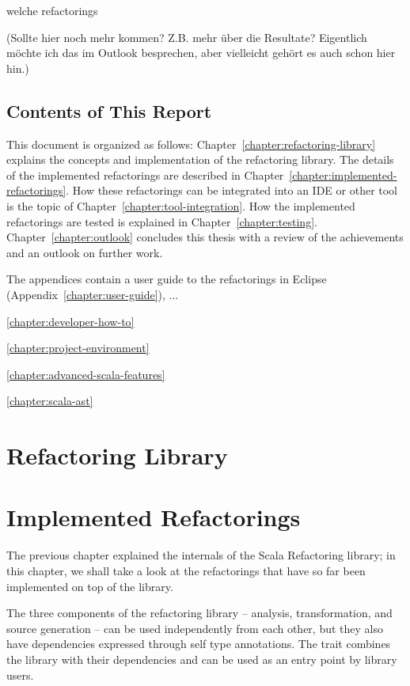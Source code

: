 \documentclass[10pt,a4paper,oneside]{scrreprt}
\begin{document}
welche refactorings

(Sollte hier noch mehr kommen? Z.B. mehr \"uber die Resultate? Eigentlich m\"ochte ich das im Outlook besprechen, aber vielleicht geh\"ort es auch schon hier hin.)

\section{Contents of This Report}

This document is organized as follows: Chapter~\vref{chapter:refactoring-library} explains the concepts and implementation of the refactoring library. The details of the implemented refactorings are described in Chapter~\vref{chapter:implemented-refactorings}. How these refactorings can be integrated into an IDE or other tool is the topic of Chapter~\vref{chapter:tool-integration}. How the implemented refactorings are tested is explained in Chapter~\vref{chapter:testing}. Chapter~\vref{chapter:outlook} concludes this thesis with a review of the achievements and an outlook on further work.

The appendices contain a user guide to the refactorings in Eclipse (Appendix~\vref{chapter:user-guide}), ...

\vref{chapter:developer-how-to}

\vref{chapter:project-environment}

\vref{chapter:advanced-scala-features}

\vref{chapter:scala-ast}

\chapter{Refactoring Library} \label{chapter:refactoring-library}



\chapter{Implemented Refactorings} \label{chapter:implemented-refactorings}

The previous chapter explained the internals of the Scala Refactoring library; in this chapter, we shall take a look at the refactorings that have so far been implemented on top of the library. 

The three components of the refactoring library -- analysis, transformation, and source generation -- can be used independently from each other, but they also have dependencies expressed through self type annotations. The  trait combines the library with their dependencies and can be used as an entry point by library users.
\end{document}
